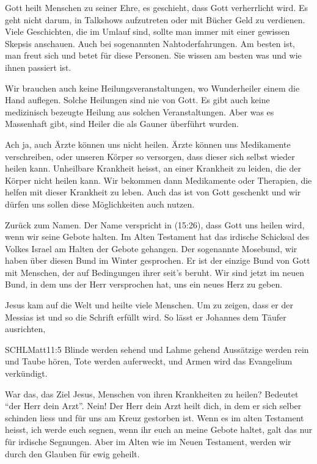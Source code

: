 \begin{otsblock}
         Gott heilt Menschen zu seiner Ehre, es geschieht, dass Gott verherrlicht wird. Es geht nicht darum, in Talkshows aufzutreten oder mit Bücher Geld zu verdienen. Viele Geschichten, die im Umlauf sind, sollte man immer mit einer gewissen Skepsis anschauen. Auch bei sogenannten Nahtoderfahrungen. Am besten ist, man freut sich und betet für diese Personen. Sie wissen am besten was und wie ihnen passiert ist. 

        Wir brauchen auch keine Heilungsveranstaltungen, wo Wunderheiler einem die Hand auflegen. Solche Heilungen sind nie von Gott. Es gibt auch keine medizinisch bezeugte Heilung aus solchen Veranstaltungen. Aber was es Massenhaft gibt, sind Heiler die als Gauner überführt wurden.

        Ach ja, auch Ärzte können uns nicht heilen. Ärzte können uns Medikamente verschreiben, oder unseren Körper so versorgen, dass dieser sich selbst wieder heilen kann. Unheilbare Krankheit heisst, an einer Krankheit zu leiden, die der Körper nicht heilen kann. Wir bekommen dann Medikamente oder Therapien, die helfen mit dieser Krankheit zu leben. Auch das ist von Gott geschenkt und wir dürfen uns sollen diese Möglichkeiten auch nutzen. 

        Zurück zum Namen. Der Name verspricht in (15:26), dass Gott uns heilen wird, wenn wir seine Gebote halten. Im Alten Testament hat das irdische Schicksal des Volkes Israel am Halten der Gebote gehangen. Der sogenannte Mosebund, wir haben über diesen Bund im Winter gesprochen. Er ist der einzige Bund von Gott mit Menschen, der auf Bedingungen ihrer seit's beruht. Wir sind jetzt im neuen Bund, in dem uns der Herr versprochen hat, uns ein neues Herz zu geben. 

        Jesus kam auf die Welt und heilte viele Menschen. Um zu zeigen, dass er der Messias ist und so die Schrift erfüllt wird. So lässt er Johannes dem Täufer ausrichten,
        \begin{bibelbox}{SCHL}{Matt}{11:5}
        Blinde werden sehend und Lahme gehend Aussätzige werden rein und Taube hören, Tote werden auferweckt, und Armen wird das Evangelium verkündigt.
        \end{bibelbox}

        War das, das Ziel Jesus, Menschen von ihren Krankheiten zu heilen? Bedeutet  \enquote{der Herr dein Arzt}. Nein! Der Herr dein Arzt heilt dich, in dem er sich selber schinden liess und für uns am Kreuz gestorben ist. Wenn es im alten Testament heisst, ich werde euch segnen, wenn ihr euch an meine Gebote haltet, galt das nur für irdische Segnungen. Aber im Alten wie im Neuen Testament, werden wir durch den Glauben für ewig geheilt.


\end{otsblock}
